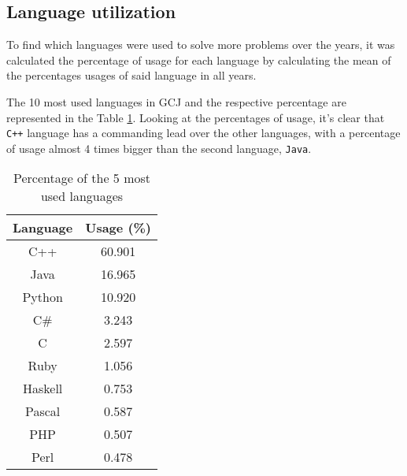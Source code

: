 \documentclass{article}
\begin{document}
\begin{multicols*}{2}


\subsection{Language utilization}

To find which languages were used to solve more problems over the years, it was calculated the percentage of usage for each language by calculating the mean of the percentages usages of said language in all years.

The 10 most used languages in GCJ and the respective percentage are represented in the Table \ref{lang_perc}.
Looking at the percentages of usage, it's clear that \texttt{C++} language has a commanding lead over the other languages, with a percentage of usage almost 4 times bigger than the second language, \texttt{Java}.

\begin{table}[H]
\centering
\caption{Percentage of the 5 most used languages}
\label{lang_perc}
\begin{tabular}{c|c}
\textbf{Language} & \textbf{Usage (\%)} \\ \hline
C++               & 60.901       \\
Java              & 16.965       \\
Python            & 10.920       \\
C\#               & 3.243        \\
C                 & 2.597        \\
Ruby              & 1.056        \\
Haskell           & 0.753        \\
Pascal            & 0.587        \\
PHP               & 0.507        \\
Perl              & 0.478
\end{tabular}
\end{table}


\end{multicols*}
\end{document}
